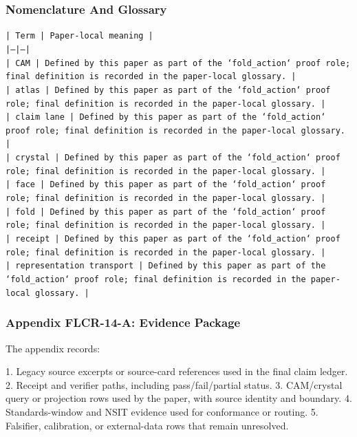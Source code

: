 \documentclass[11pt]{article}
\begin{document}
\subsubsection*{Nomenclature And Glossary}

\noindent\texttt{| Term | Paper-local meaning |}\\
\noindent\texttt{|---|---|}\\
\noindent\texttt{| CAM | Defined by this paper as part of the `fold\_action` proof role; final definition is recorded in the paper-local glossary. |}\\
\noindent\texttt{| atlas | Defined by this paper as part of the `fold\_action` proof role; final definition is recorded in the paper-local glossary. |}\\
\noindent\texttt{| claim lane | Defined by this paper as part of the `fold\_action` proof role; final definition is recorded in the paper-local glossary. |}\\
\noindent\texttt{| crystal | Defined by this paper as part of the `fold\_action` proof role; final definition is recorded in the paper-local glossary. |}\\
\noindent\texttt{| face | Defined by this paper as part of the `fold\_action` proof role; final definition is recorded in the paper-local glossary. |}\\
\noindent\texttt{| fold | Defined by this paper as part of the `fold\_action` proof role; final definition is recorded in the paper-local glossary. |}\\
\noindent\texttt{| receipt | Defined by this paper as part of the `fold\_action` proof role; final definition is recorded in the paper-local glossary. |}\\
\noindent\texttt{| representation transport | Defined by this paper as part of the `fold\_action` proof role; final definition is recorded in the paper-local glossary. |}\\

\subsubsection*{Appendix FLCR-14-A: Evidence Package}

The appendix records:

1. Legacy source excerpts or source-card references used in the final claim ledger.
2. Receipt and verifier paths, including pass/fail/partial status.
3. CAM/crystal query or projection rows used by the paper, with source identity and boundary.
4. Standards-window and NSIT evidence used for conformance or routing.
5. Falsifier, calibration, or external-data rows that remain unresolved.
\end{document}
